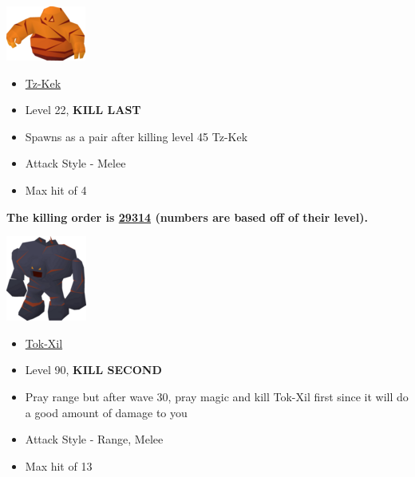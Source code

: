 \documentclass{article}
\begin{document}
\begin{multicols}{2}
  \null \vfill
  \includegraphics[width=.3\textwidth]{kek22.png}
  \vfill \null
\columnbreak
  \null \vfill
  \begin{itemize}
    \item \underline{Tz-Kek}
    \item Level 22, \textbf{KILL LAST}
    \item Spawns as a pair after killing level 45 Tz-Kek
    \item Attack Style - Melee
    \item Max hit of 4
    
  \end{itemize}
  \vfill \null
\end{multicols}

\textbf{The killing order is \underline{29314} (numbers are based off of their level). }
\begin{multicols}{2}
  \null \vfill
  \includegraphics[width=.3\textwidth]{tokxil.png}
  \vfill \null
\columnbreak
  \null \vfill
  \begin{itemize}
    \item \underline{Tok-Xil}
    \item Level 90, \textbf{KILL SECOND}
    \item Pray range but after wave 30, pray magic and kill Tok-Xil first since it will do a good amount of damage to you
    \item Attack Style - Range, Melee
    \item Max hit of 13
  \end{itemize}
  \vfill \null
\end{multicols}
\end{document}
